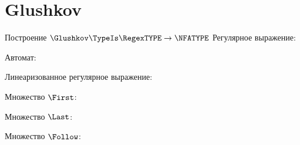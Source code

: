 \section{Glushkov}
\begin{frame}{Построение $\Glushkov\TypeIs\RegexTYPE\to\NFATYPE$}
	Регулярное выражение:

	Автомат:


	Линеаризованное регулярное выражение:


	Множество $\First$:


	Множество $\Last$:


	Множество $\Follow$:


\end{frame}




